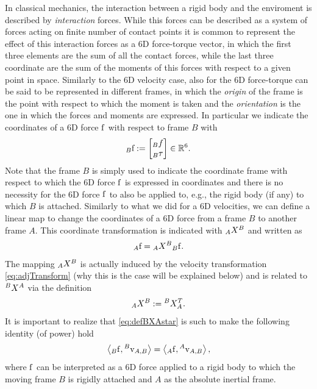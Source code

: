 In classical mechanics, the interaction between a rigid body and the enviroment is described by \emph{interaction} forces. 
While this forces can be described as a system of forces acting on finite number of contact points 
it is common to represent the effect of this interaction forces as a 6D force-torque vector, in which the first three elements are the sum of all the contact forces, while the last three coordinate are the sum of the moments of this forces with respect to a given point in space. Similarly to the 6D velocity case, also for the 6D force-torque can be said to be represented in different frames, in which the \emph{origin} of the frame is the point with respect to which the moment is taken and the \emph{orientation} is the one in which the forces and moments are expressed. In particular we indicate the coordinates of a 6D force ${\rm f}$ 
with respect to frame $B$ with
\begin{equation}
\hspace{0em}_B{\rm f} := 
\begin{bmatrix}
\hspace{0em}_Bf \\
\hspace{0em}_B\tau
\end{bmatrix} \in \mathbb{R}^6. 
\end{equation}
Note that the frame $B$ is simply used to indicate the coordinate frame with respect to which the 6D force ${\rm f}$ is expressed in coordinates and there is no necessity for the 6D force ${\rm f}$ to also be applied to, e.g., the rigid body (if any) to which $B$ is attached. Similarly to what we did for a 6D velocities, we can define a linear map to change the coordinates of a 6D force from a frame $B$ to another frame $A$. This coordinate transformation is indicated with $\hspace{0em}_AX^B$ and written as
\begin{align}
  \hspace{0em}_A{\rm f} = \hspace{0em}_AX^B \hspace{0em}_B{\rm f} . 
\end{align}
The mapping $\hspace{0em}_AX^B$ is actually induced by the velocity transformation \eqref{eq:adjTransform} (why this is the case will be explained below) and is related to $\hspace{0em}^BX^A$ via the definition
\begin{equation} \label{eq:defBXAstar}
  \hspace{0em}_AX^B := \hspace{0em}^BX^T_A .
\end{equation}
It is important to realize that \eqref{eq:defBXAstar} is such to make the following identity (of power) hold
\begin{align}
\left<\hspace{0em}_B {\rm f}, \hspace{0em}^B{\rm v}_{A,B} \right> = 
\left<\hspace{0em}_A {\rm f}, \hspace{0em}^A{\rm v}_{A,B} \right> ,
\end{align}
where ${\rm f}$ can be interpreted as a 6D force applied to a rigid body to which the moving frame $B$ is rigidly attached and $A$ as the absolute inertial frame.
\\

